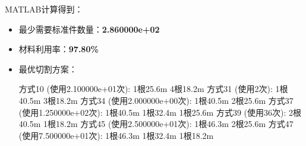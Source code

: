 \documentclass[fontset=windows,openright]{ctexrep}
\begin{document}
MATLAB计算得到：
\begin{itemize}
    \item 最少需要标准件数量：\textbf{2.860000e+02}
    \item 材料利用率：\textbf{97.80\%}
    \item 最优切割方案：
    \begin{mcode}
    方式10 (使用2.100000e+01次): 1根25.6m 4根18.2m 
    方式31 (使用2次): 1根40.5m 3根18.2m 
    方式34 (使用2.000000e+00次): 1根40.5m 2根25.6m 
    方式37 (使用1.250000e+02次): 1根40.5m 1根32.4m 1根25.6m 
    方式39 (使用36次): 2根40.5m 1根18.2m 
    方式45 (使用2.500000e+01次): 1根46.3m 2根25.6m 
    方式47 (使用7.500000e+01次): 1根46.3m 1根32.4m 1根18.2m 
    \end{mcode}
\end{itemize}
\end{document}
